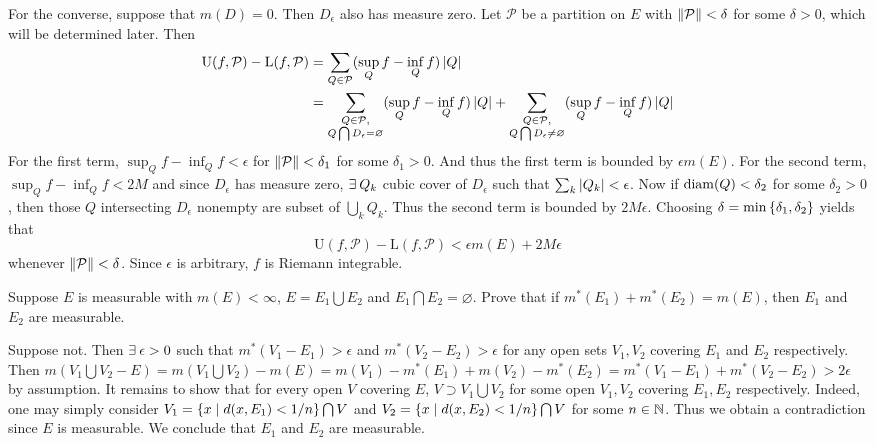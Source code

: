 \begin{pf}
    For the converse, suppose that $m(D)=0$. Then $D_\epsilon$ 
    also has measure zero. Let $\mathcal{P}$ be a partition 
    on $E$ with $\left\lVert {\mathcal{P}} \right\rVert<\delta$ for some 
    $\delta>0$, which will be determined later. Then 
    \begin{equation*}
        \begin{split}
            \mathrm{U}(f,\mathcal{P})-\mathrm{L}(f,\mathcal{P}) 
            &= \sum_{Q\in\mathcal{P}}(\sup_Q f -\inf_Q f)\left\lvert {Q} \right\rvert\\ 
            &= \sum_{\substack{Q\in\mathcal{P},\\ Q\bigcap 
            D_\epsilon = \varnothing}}(\sup_Q f -\inf_Q f)\left\lvert {Q} \right\rvert 
            + \sum_{\substack{Q\in\mathcal{P},\\ Q\bigcap 
            D_\epsilon\neq\varnothing}}(\sup_Q f -\inf_Q f)\left\lvert {Q} \right\rvert
        \end{split}
    \end{equation*}
    For the first term, $\sup_Q f -\inf_Q f < \epsilon$ for 
    $\left\lVert {\mathcal{P}} \right\rVert<\delta_1$ for some $\delta_1>0$. And 
    thus the first term is bounded by $\epsilon m(E)$. For the 
    second term, $\sup_Q f -\inf_Q f < 2M$ and since 
    $D_\epsilon$ has measure zero, $\exists\: Q_k$ cubic cover 
    of $D_\epsilon$ such that $\sum_k \left\lvert {Q_k} \right\rvert<\epsilon$. 
    Now if $\diam{Q}<\delta_2$ for some $\delta_2>0$, then 
    those $Q$ intersecting $D_\epsilon$ nonempty are subset 
    of $\bigcup_k Q_k$. Thus the second term is bounded by 
    $2M\epsilon$. Choosing $\delta = \min\left\{ {\delta_1, 
    \delta_2} \right\}$ yields that 
    \[
        \mathrm{U}(f,\mathcal{P})-\mathrm{L}(f,\mathcal{P}) 
        < \epsilon m(E) + 2M\epsilon
    \]
    whenever $\left\lVert {\mathcal{P}} \right\rVert<\delta$. Since $\epsilon$ is 
    arbitrary, $f$ is Riemann integrable.
\end{pf}

\begin{problem}
    Suppose $E$ is measurable with $m(E)<\infty$, $E=E_1\bigcup 
    E_2$ and $E_1\bigcap E_2=\varnothing$. Prove that if 
    $m^*(E_1) + m^*(E_2) = m(E)$, then $E_1$ and $E_2$ are 
    measurable. 
\end{problem}
\begin{pf}
    Suppose not. Then $\exists\: \epsilon>0$ such that 
    $m^*(V_1-E_1)>\epsilon$ and $m^*(V_2-E_2)>\epsilon$ for 
    any open sets $V_1,V_2$ covering $E_1$ and $E_2$ 
    respectively. Then $m(V_1\bigcup V_2-E) = m(V_1\bigcup V_2) 
    - m(E) = m(V_1)-m^*(E_1)+m(V_2)-m^*(E_2) = m^*(V_1-E_1) + 
    m^*(V_2-E_2)>2\epsilon$ by assumption. It remains to show 
    that for every open $V$ covering $E$, $V\supset V_1
    \bigcup V_2$ for some open $V_1,V_2$ covering $E_1,E_2$ 
    respectively. Indeed, one may simply consider $V_1 = 
    \left\{ x \;\middle\vert\; d(x,E_1)<1/n \right\}\bigcap V$ and $V_2 = 
    \left\{ x \;\middle\vert\; d(x,E_2)<1/n \right\}\bigcap V$ for some $n\in\mathbb{N}$. 
    Thus we obtain a contradiction since $E$ is measurable.
    We conclude that $E_1$ and $E_2$ are measurable.
\end{pf}

